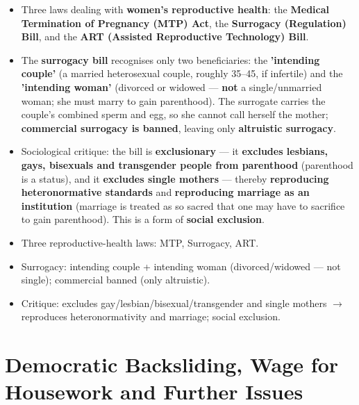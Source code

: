 \begin{KeyConcept}
\begin{itemize}
\item Three laws dealing with \textbf{women's reproductive health}: the \textbf{Medical Termination of Pregnancy (MTP) Act}, the \textbf{Surrogacy (Regulation) Bill}, and the \textbf{ART (Assisted Reproductive Technology) Bill}.
\item The \textbf{surrogacy bill} recognises only two beneficiaries: the \textbf{'intending couple'} (a married heterosexual couple, roughly 35--45, if infertile) and the \textbf{'intending woman'} (divorced or widowed --- \textbf{not} a single/unmarried woman; she must marry to gain parenthood). The surrogate carries the couple's combined sperm and egg, so she cannot call herself the mother; \textbf{commercial surrogacy is banned}, leaving only \textbf{altruistic surrogacy}.
\item Sociological critique: the bill is \textbf{exclusionary} --- it \textbf{excludes lesbians, gays, bisexuals and transgender people from parenthood} (parenthood is a status), and it \textbf{excludes single mothers} --- thereby \textbf{reproducing heteronormative standards} and \textbf{reproducing marriage as an institution} (marriage is treated as so sacred that one may have to sacrifice to gain parenthood). This is a form of \textbf{social exclusion}.
\end{itemize}
\end{KeyConcept}

\begin{QuickRevision}
\begin{itemize}
\item Three reproductive-health laws: MTP, Surrogacy, ART.
\item Surrogacy: intending couple + intending woman (divorced/widowed --- not single); commercial banned (only altruistic).
\item Critique: excludes gay/lesbian/bisexual/transgender and single mothers $\rightarrow$ reproduces heteronormativity and marriage; social exclusion.
\end{itemize}
\end{QuickRevision}

\section{Democratic Backsliding, Wage for Housework and Further Issues}


